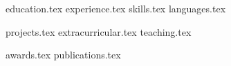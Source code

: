 \documentclass[letterpaper,11pt]{article}
\begin{document}
{education.tex}
{experience.tex}
\sidebyside
    {{skills.tex}}
    {{languages.tex}}


{projects.tex}
{extracurricular.tex}
{teaching.tex}

{awards.tex}
{publications.tex}
\end{document}
